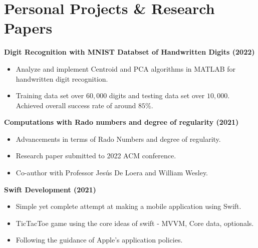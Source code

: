 \section{\sc Personal Projects \& Research Papers}

{\bf{Digit Recognition with MNIST Databset of Handwritten Digits} (2022)}\\
\begin{itemize}
\setlength\itemsep{0em}
\item Analyze and implement Centroid and PCA algorithms in MATLAB for handwritten digit recognition. 
\item Training data set over $60,000$ digits and testing data set over $10,000$. Achieved overall success rate of around $85\%$.
\end{itemize}

{\bf{Computations with Rado numbers and degree of regularity} (2021)}\\
\begin{itemize}
\setlength\itemsep{0em}
\item Advancements in terms of Rado Numbers and degree of regularity.
\item Research paper submitted to 2022 ACM conference.
\item Co-author with Professor Jes\'{u}s De Loera and William Wesley.
\end{itemize}

{\bf{Swift Development} (2021)}\\
\begin{itemize}
\setlength\itemsep{0em}
\item Simple yet complete attempt at making a mobile application using Swift.
\item TicTacToe game using the core ideas of swift - MVVM, Core data, optionals.
\item Following the guidance of Apple's application policies. 
\end{itemize}



